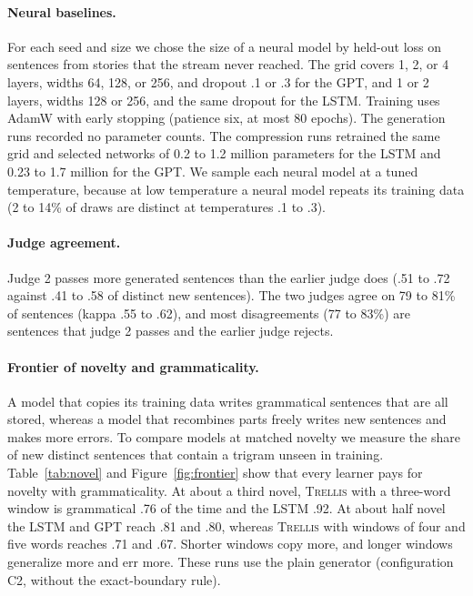 \documentclass[11pt,letterpaper]{article}
\newcommand{\trellis}{\textsc{Trellis}}
\begin{document}
\paragraph{Neural baselines.} For each seed and size we chose the size of a neural model by held-out loss on sentences from stories that the stream never reached.
The grid covers 1, 2, or 4 layers, widths 64, 128, or 256, and dropout .1 or .3 for the GPT, and 1 or 2 layers, widths 128 or 256, and the same dropout for the LSTM.
Training uses AdamW with early stopping (patience six, at most 80 epochs). The generation runs recorded no parameter counts. The compression runs retrained the same grid and selected networks of 0.2 to 1.2 million parameters for the LSTM and 0.23 to 1.7 million for the GPT.
We sample each neural model at a tuned temperature, because at low temperature a neural model repeats its training data (2 to 14\% of draws are distinct at temperatures .1 to .3).

\paragraph{Judge agreement.} Judge 2 passes more generated sentences than the earlier judge does (.51 to .72 against .41 to .58 of distinct new sentences). The two judges agree on 79 to 81\% of sentences (kappa .55 to .62), and most disagreements (77 to 83\%) are sentences that judge 2 passes and the earlier judge rejects.

\paragraph{Frontier of novelty and grammaticality.} A model that copies its training data writes grammatical sentences that are all stored, whereas a model that recombines parts freely writes new sentences and makes more errors.
To compare models at matched novelty we measure the share of new distinct sentences that contain a trigram unseen in training. Table~\ref{tab:novel} and Figure~\ref{fig:frontier} show that every learner pays for novelty with grammaticality.
At about a third novel, \trellis{} with a three-word window is grammatical .76 of the time and the LSTM .92. At about half novel the LSTM and GPT reach .81 and .80, whereas \trellis{} with windows of four and five words reaches .71 and .67.
Shorter windows copy more, and longer windows generalize more and err more. These runs use the plain generator (configuration C2, without the exact-boundary rule).
\end{document}
